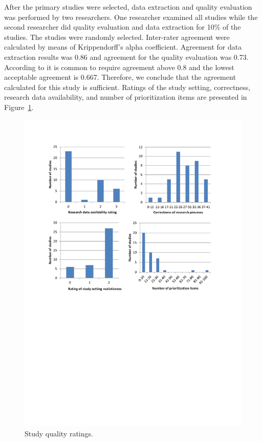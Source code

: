 After the primary studies were selected, data extraction and quality evaluation was performed by two researchers.
One researcher examined all studies while the second researcher did quality evaluation and data extraction for 10\% of the studies. 
The studies were randomly selected.
Inter-rater agreement were calculated by means of Krippendorff's alpha coefficient.
Agreement for data extraction results was 0.86 and agreement for the quality evaluation was 0.73.
According to \cite{Krippendorff2004a} it is common to require agreement above 0.8 and the lowest acceptable agreement is 0.667. Therefore, we conclude that the agreement calculated for this study is sufficient.
Ratings of the study setting, correctness, research data availability, and number of prioritization items are presented in Figure~\ref{fig:qeResults}.

\begin{figure}
	\center
\includegraphics[bb=60bp 360bp 560bp 790bp,clip,scale=0.70]{fig/qeResults}
\caption{\label{fig:qeResults}Study quality ratings.}
\end{figure}

